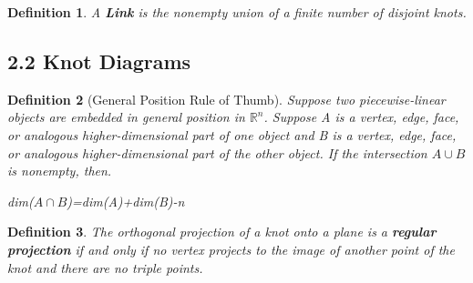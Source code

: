 \documentclass[executivepaper]{article}
\newtheorem{definition}{Definition}
\begin{document}
\vspace{2mm}

\begin{tcolorbox}

\begin{definition}

\textit{A \textbf{Link} is the nonempty union of a finite number of disjoint knots.}

\end{definition}

\end{tcolorbox}

\subsection*{2.2 Knot Diagrams}

\begin{tcolorbox}

\begin{definition}[General Position Rule of Thumb]

\textit{Suppose two piecewise-linear objects are embedded in general position in $\mathbb{R}^{n}$. Suppose A is a vertex, edge, face, or analogous higher-dimensional part of one object and B is a vertex, edge, face, or analogous higher-dimensional part of the other object. If the intersection $A \cup B$ is nonempty, then.}

\begin{center}

dim($A \cap B$)=dim(A)+dim(B)-n

\end{center}

\end{definition}

\end{tcolorbox}

\vspace{2mm}

\begin{tcolorbox}

\begin{definition}

\textit{The orthogonal projection of a knot onto a plane is a \textbf{regular projection} if and only if no vertex projects to the image of another point of the knot and there are no triple points.}

\end{definition}

\end{tcolorbox}
\end{document}
